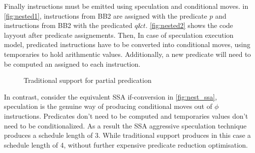 Finally instructions must be emitted using speculation and conditional moves. in \ref{fig:nested1}, instructions from BB2 are assigned with the predicate $p$ and instructions from BB2 with the predicated $q\&t$. \ref{fig:nested2} shows the code layyout after predicate assignements. Then, In case of speculation execution model, predicated instructions have to be converted into conditional moves, using temporaries to hold arithmentic values. Additionally, a new predicate will need to be computed an assigned to each instruction.
\begin{figure}
\caption{Traditional support for partial predication}
\label{fig:trad_part_pred}
\end{figure}

In contrast, consider the equivalent SSA if-conversion in \ref{fig:nest_ssa}, speculation is the genuine way of producing conditional moves out of $\phi$ instructions. Predicates don't need to be computed and temporaries values don't need to be conditionalized. As a result the SSA aggressive speculation technique produces a schedule length of 3. While traditional support produces in this case a schedule length of 4, without further expensive predicate reduction optimisation.

